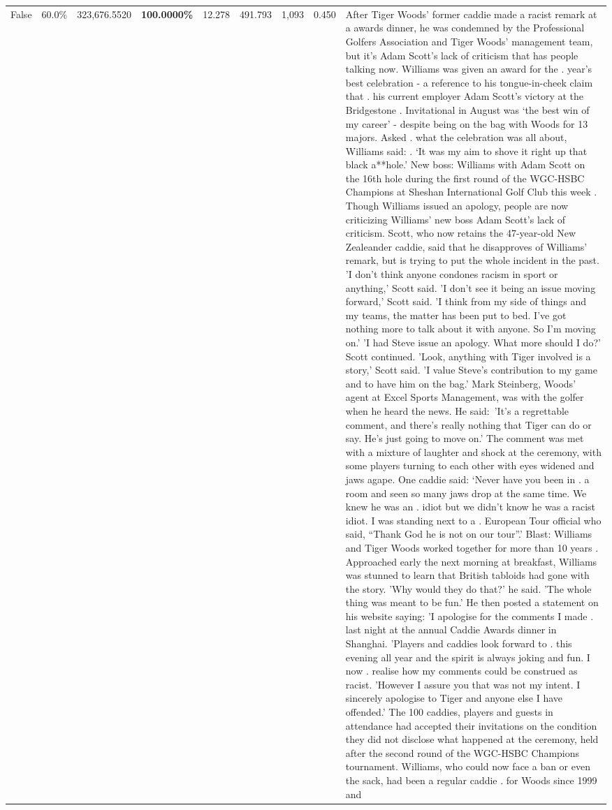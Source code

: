 \begin{table}[H]
\begin{tabular}{lllrlllll}
False & 60.0\% & 323,676.5520 & \bfseries \color{red} 100.0000\% & 12.278 & 491.793 & 1,093 & 0.450 & After Tiger Woods' former caddie made a racist remark at a awards dinner, he was condemned by the Professional Golfers Association and Tiger Woods' management team, but it's Adam Scott's lack of criticism that has people talking now. Williams was given an award for the . year’s best celebration - a reference to his tongue-in-cheek claim that . his current employer Adam Scott’s victory at the Bridgestone . Invitational in August was ‘the best win of my career’ - despite being on the bag with Woods for 13 majors. Asked . what the celebration was all about, Williams said: . ‘It was my aim to shove it right up that black a**hole.’ New boss: Williams with Adam Scott  on the 16th hole during the first round of the WGC-HSBC Champions at Sheshan International Golf Club this week . Though Williams issued an apology, people are now criticizing Williams' new boss Adam Scott's lack of criticism. Scott, who now retains the 47-year-old New Zealeander caddie, said that he disapproves of Williams' remark, but is trying to put the whole incident in the past. 'I don't think anyone condones racism in sport or anything,' Scott said. 'I don't see it being an issue moving forward,' Scott said. 'I think from my side of things and my teams, the matter has been put to bed. I've got nothing more to talk about it with anyone. So I'm moving on.' 'I had Steve issue an apology. What more should I do?' Scott continued. 'Look, anything with Tiger involved is a story,' Scott said. 'I value Steve's contribution to my game and to have him on the bag.' Mark Steinberg, Woods' agent at Excel Sports Management, was with the golfer when he heard the news. He said: 'It's a regrettable comment, and there's really nothing that Tiger can do or say. He's just going to move on.' The comment was met with a mixture of laughter and shock at the ceremony, with some players turning to each other with eyes widened and jaws agape. One caddie said: ‘Never have you been in . a room and seen so many jaws drop at the same time. We knew he was an . idiot but we didn’t know he was a racist idiot. I was standing next to a . European Tour official who said, “Thank God he is not on our tour”.’ Blast: Williams and Tiger Woods worked together for more than 10 years . Approached early the next morning at breakfast, Williams was stunned to learn that British tabloids had gone with the story. 'Why would they do that?' he said. 'The whole thing was meant to be fun.' He then posted a statement on his website saying: 'I apologise for the comments I made . last night at the annual Caddie Awards dinner in Shanghai. 'Players and caddies look forward to . this evening all year and the spirit is always joking and fun. I now . realise how my comments could be construed as racist. 'However I assure you that was not my intent. I sincerely apologise to Tiger and anyone else I have offended.' The 100 caddies, players and guests in attendance had accepted their invitations on the condition they did not disclose what happened at the ceremony, held after the second round of the WGC-HSBC Champions tournament. Williams, who could now face a ban or even the sack, had been a regular caddie . for Woods since 1999 and 
\end{tabular}
\end{table}
